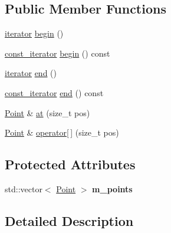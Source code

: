 \subsection*{Public Member Functions}
\begin{DoxyCompactItemize}
\item 
\hyperlink{classsimo_1_1shapes_1_1_point_collection_a25dbe26192164dc3dbed17ecbbdb5b3d}{iterator} \hyperlink{classsimo_1_1shapes_1_1_point_collection_a9f997d10393ab1a957909a4864a19175}{begin} ()
\item 
\hyperlink{classsimo_1_1shapes_1_1_point_collection_a74bbad0a4b30238f8cebfe6eea4d7c1c}{const\-\_\-iterator} \hyperlink{classsimo_1_1shapes_1_1_point_collection_acae80ce3a9e712db307ad92e0045683d}{begin} () const 
\item 
\hyperlink{classsimo_1_1shapes_1_1_point_collection_a25dbe26192164dc3dbed17ecbbdb5b3d}{iterator} \hyperlink{classsimo_1_1shapes_1_1_point_collection_a6469545ecccb2731589b493c3960a5fd}{end} ()
\item 
\hyperlink{classsimo_1_1shapes_1_1_point_collection_a74bbad0a4b30238f8cebfe6eea4d7c1c}{const\-\_\-iterator} \hyperlink{classsimo_1_1shapes_1_1_point_collection_a82881946822302c9b332213c412c2162}{end} () const 
\item 
\hyperlink{classsimo_1_1shapes_1_1_point}{Point} \& \hyperlink{classsimo_1_1shapes_1_1_point_collection_a527321410b3afd8f5dca11091f05b8b1}{at} (size\-\_\-t pos)
\item 
\hyperlink{classsimo_1_1shapes_1_1_point}{Point} \& \hyperlink{classsimo_1_1shapes_1_1_point_collection_a14cfb96d5aaa33c7607b9bed57f4d69a}{operator\mbox{[}$\,$\mbox{]}} (size\-\_\-t pos)
\end{DoxyCompactItemize}
\subsection*{Protected Attributes}
\begin{DoxyCompactItemize}
\item 
\hypertarget{classsimo_1_1shapes_1_1_point_collection_a0e2535e3dcccc303462cb2f258a42edd}{std\-::vector$<$ \hyperlink{classsimo_1_1shapes_1_1_point}{Point} $>$ {\bfseries m\-\_\-points}}\label{classsimo_1_1shapes_1_1_point_collection_a0e2535e3dcccc303462cb2f258a42edd}

\end{DoxyCompactItemize}


\subsection{Detailed Description}
